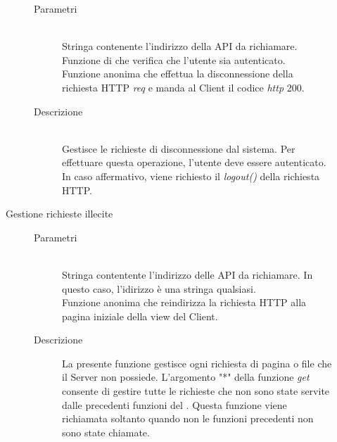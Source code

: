 \begin{description}
\begin{description}
\begin{mldescription}
 \begin{description}
  \item[Parametri]
   \begin{mldescription}
     \hfill \\
    Stringa contenente l'indirizzo della API da richiamare.
     \hfill \\
    Funzione di  che verifica che l'utente sia autenticato.
     \hfill \\
    Funzione anonima che effettua la disconnessione della richiesta HTTP \textit{req} e manda al Client il codice \textit{http} 200.
   \end{mldescription}
  \item[Descrizione] \hfill \\
 Gestisce le richieste di disconnessione dal sistema. Per effettuare questa operazione, l'utente deve essere autenticato. In caso affermativo, viene richiesto il \textit{logout()} della richiesta HTTP.
 \end{description}
 
 \end{mldescription}

\item[Gestione richieste illecite]
 \begin{mldescription}
 \begin{description}
  \item[Parametri]
   \begin{mldescription}
     \hfill \\
    Stringa contentente l'indirizzo delle API da richiamare. In questo caso, l'idirizzo è una stringa qualsiasi.
     \hfill \\
    Funzione anonima che reindirizza la richiesta HTTP alla pagina iniziale della view del Client.
   \end{mldescription}
  \item[Descrizione]
 La presente funzione gestisce ogni richiesta di pagina o file che il Server non possiede. L'argomento "*" della funzione \textit{get} consente di gestire tutte le richieste che non sono state servite dalle precedenti funzioni del . Questa funzione viene richiamata soltanto quando non le funzioni precedenti non sono state chiamate.
 \end{description} 
 \end{mldescription}


\end{description}
\end{description}
